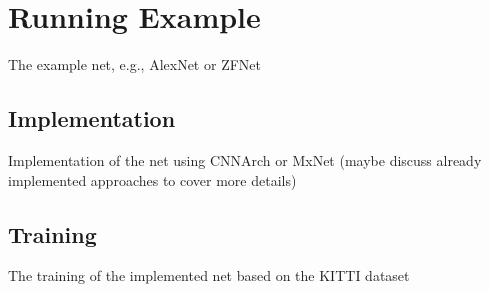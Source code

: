 \chapter{Running Example}

The example net, e.g., AlexNet \cite{krizhevsky2012imagenet} or ZFNet \cite{zeiler2014visualizing}

\section{Implementation}

Implementation of the net using CNNArch or MxNet
(maybe discuss already implemented approaches to cover more details)

\section{Training}

The training of the implemented net based on the KITTI dataset \cite{geiger2013vision}
